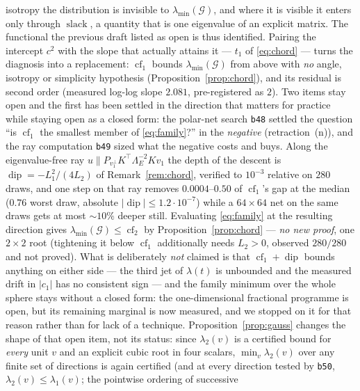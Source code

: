 \documentclass[11pt]{article}
\theoremstyle{remark}
\newcommand{\Gr}{\mathcal{G}}
\newcommand{\Le}{\Lambda_E}
\begin{document}
\begin{enumerate}
isotropy the distribution is invisible to $\lambda_{\min}(\Gr)$, and where it is visible it enters only
through $\operatorname{slack}$, a quantity that is one eigenvalue of an explicit matrix. The functional
the previous draft listed as open is thus identified. Pairing the intercept $c^{2}$ with the slope
that actually attains it --- $t_{1}$ of \eqref{eq:chord} --- turns the diagnosis into a replacement:
$\operatorname{cf}_{1}$ bounds $\lambda_{\min}(\Gr)$ from above with \emph{no} angle, isotropy or
simplicity hypothesis (Proposition~\ref{prop:chord}), and its residual is second order (measured
log-log slope $2.081$, pre-registered as $2$). Two items stay open and the first has been settled in
the direction that matters for practice while staying open as a closed form: the polar-net search \texttt{b48} settled the
question ``is $\operatorname{cf}_{1}$ the smallest member of \eqref{eq:family}?'' in the
\emph{negative} (retraction~(n)), and the ray computation \texttt{b49} sized what the negative costs and buys. Along the
eigenvalue-free ray $u\parallel P_{v_{1}^{\perp}}K^{\top}\Le^{-2}Kv_{1}$ the depth of the descent is
$\operatorname{dip}=-L_1^{2}/(4L_2)$ of Remark~\ref{rem:chord}, verified to $10^{-3}$ relative on $280$
draws, and one step on that ray removes $0.0004$--$0.50$ of $\operatorname{cf}_{1}$'s gap at the median
($0.76$ worst draw, absolute $|\operatorname{dip}|\le1.2\cdot10^{-7}$) while a $64\times64$ net on the
same draws gets at most $\sim10\%$ deeper still. Evaluating \eqref{eq:family} at the resulting direction
gives $\lambda_{\min}(\Gr)\le\operatorname{cf}_{2}$ by Proposition~\ref{prop:chord} --- \emph{no new
proof}, one $2\times2$ root (tightening it below $\operatorname{cf}_{1}$ additionally needs $L_2>0$,
observed $280/280$ and not proved). What is deliberately \emph{not} claimed
is that $\operatorname{cf}_{1}+\operatorname{dip}$ bounds anything on either side --- the third jet of
$\lambda(t)$ is unbounded and the measured drift in $|c_1|$ has no consistent sign --- and the family
minimum over the whole sphere stays without a closed form: the one-dimensional fractional programme is
open, but its remaining marginal is now measured, and we stopped on it for that reason rather than for
lack of a technique. Proposition~\ref{prop:gauss} changes the shape of that open item, not its status:
since $\lambda_2(v)$ is a certified bound for \emph{every} unit $v$ and an explicit cubic root in four
scalars, $\min_{v}\lambda_2(v)$ over any finite set of directions is again certified (and at every
direction tested by \texttt{b50}, $\lambda_2(v)\le\lambda_1(v)$; the pointwise ordering of successive

\end{enumerate}
\end{document}
